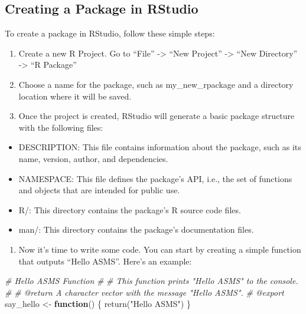 \documentclass[
]{book}
\newenvironment{Shaded}{\begin{snugshade}}{\end{snugshade}}
\newcommand{\CommentTok}[1]{\textcolor[rgb]{0.56,0.35,0.01}{\textit{#1}}}
\newcommand{\ControlFlowTok}[1]{\textcolor[rgb]{0.13,0.29,0.53}{\textbf{#1}}}
\newcommand{\FunctionTok}[1]{\textcolor[rgb]{0.00,0.00,0.00}{#1}}
\newcommand{\NormalTok}[1]{#1}
\newcommand{\OtherTok}[1]{\textcolor[rgb]{0.56,0.35,0.01}{#1}}
\newcommand{\StringTok}[1]{\textcolor[rgb]{0.31,0.60,0.02}{#1}}
\providecommand{\tightlist}{%
  \setlength{\itemsep}{0pt}\setlength{\parskip}{0pt}}
\begin{document}
\hypertarget{creating-a-package-in-rstudio}{%
\subsection*{Creating a Package in RStudio}\label{creating-a-package-in-rstudio}}

To create a package in RStudio, follow these simple steps:

\begin{enumerate}
\def\labelenumi{\arabic{enumi}.}
\tightlist
\item
  Create a new R Project. Go to ``File'' -\textgreater{} ``New Project'' -\textgreater{} ``New Directory'' -\textgreater{} ``R Package''
\item
  Choose a name for the package, such as my\_new\_rpackage and a directory location where it will be saved.
\item
  Once the project is created, RStudio will generate a basic package structure with the following files:
\end{enumerate}

\begin{itemize}
\tightlist
\item
  DESCRIPTION: This file contains information about the package, such as its name, version, author, and dependencies.
\item
  NAMESPACE: This file defines the package's API, i.e., the set of functions and objects that are intended for public use.
\item
  R/: This directory contains the package's R source code files.
\item
  man/: This directory contains the package's documentation files.
\end{itemize}

\begin{enumerate}
\def\labelenumi{\arabic{enumi}.}
\tightlist
\item
  Now it's time to write some code. You can start by creating a simple function that outputs ``Hello ASMS''. Here's an example:
\end{enumerate}

\begin{Shaded}
\begin{Highlighting}[]
\CommentTok{\#\textquotesingle{} Hello ASMS Function}
\CommentTok{\#\textquotesingle{}}
\CommentTok{\#\textquotesingle{} This function prints "Hello ASMS" to the console.}
\CommentTok{\#\textquotesingle{}}
\CommentTok{\#\textquotesingle{} @return A character vector with the message "Hello ASMS".}
\CommentTok{\#\textquotesingle{} @export}
\NormalTok{say\_hello }\OtherTok{\textless{}{-}} \ControlFlowTok{function}\NormalTok{() \{}
  \FunctionTok{return}\NormalTok{(}\StringTok{"Hello ASMS"}\NormalTok{)}
\NormalTok{\}}
\end{Highlighting}
\end{Shaded}
\end{document}
